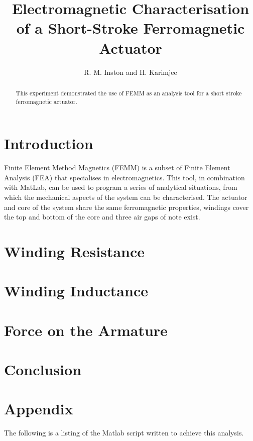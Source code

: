 \documentclass[a4paper]{IEEEtran}
\begin{document}
\title{Electromagnetic Characterisation of a Short-Stroke Ferromagnetic Actuator}
\author{R. M. Inston and H. Karimjee}

\maketitle
\begin{abstract}
This experiment demonstrated the use of FEMM as an analysis tool for a short stroke ferromagnetic actuator. 
\end{abstract}

\section{Introduction}
Finite Element Method Magnetics (FEMM) is a subset of Finite Element Analysis (FEA) that specialises in electromagnetics. This tool, in combination with MatLab, can be used to program a series of analytical situations, from which the mechanical aspects of the system can be characterised. The actuator and core of the system share the same ferromagnetic properties, windings cover the top and bottom of the core and three air gaps of note exist.

\section{Winding Resistance}

\section{Winding Inductance}

\section{Force on the Armature}

\section{Conclusion}

\pagebreak
\onecolumn
\section{Appendix}
The following is a listing of the Matlab script written to achieve this analysis.

\end{document}
